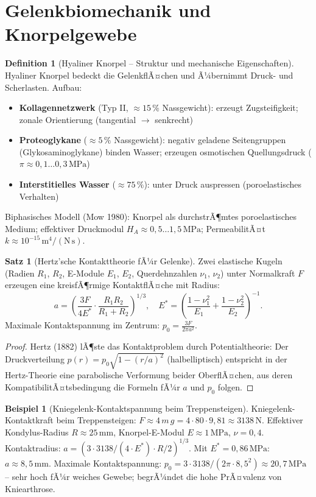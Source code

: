 ﻿\documentclass[a4paper,12pt]{report}
\theoremstyle{definition}
\newtheorem{definition}{Definition}
\newtheorem{beispiel}{Beispiel}
\newtheorem{satz}{Satz}
\begin{document}
\section{Gelenkbiomechanik und Knorpelgewebe}

\begin{definition}[Hyaliner Knorpel -- Struktur und mechanische Eigenschaften]
Hyaliner Knorpel bedeckt die GelenkflÃ¤chen und Ã¼bernimmt Druck- und Scherlasten.
Aufbau:
\begin{itemize}
    \item[-] \textbf{Kollagennetzwerk} (Typ II, $\approx 15\,\%$ Nassgewicht):
          erzeugt Zugsteifigkeit; zonale Orientierung (tangential $\to$ senkrecht)
    \item[-] \textbf{Proteoglykane} ($\approx 5\,\%$ Nassgewicht):
          negativ geladene Seitengruppen (Glykosaminoglykane) binden Wasser;
          erzeugen osmotischen Quellungsdruck ($\pi \approx 0{,}1\ldots0{,}3\,\mathrm{MPa}$)
    \item[-] \textbf{Interstitielles Wasser} ($\approx 75\,\%$):
          unter Druck auspressen (poroelastisches Verhalten)
\end{itemize}
Biphasisches Modell (Mow 1980): Knorpel als durchstrÃ¶mtes poroelastisches
Medium; effektiver Druckmodul $H_A \approx 0{,}5\ldots1{,}5\,\mathrm{MPa}$;
PermeabilitÃ¤t $k \approx 10^{-15}\,\mathrm{m^4/(N\,s)}$.
\end{definition}

\begin{satz}[Hertz'sche Kontakttheorie fÃ¼r Gelenke]
Zwei elastische Kugeln (Radien $R_1$, $R_2$, E-Module $E_1$, $E_2$,
Querdehnzahlen $\nu_1$, $\nu_2$) unter Normalkraft $F$ erzeugen eine
kreisfÃ¶rmige KontaktflÃ¤che mit Radius:
\[
  a = \left(\frac{3F}{4E^*}\cdot\frac{R_1 R_2}{R_1+R_2}\right)^{1/3},
  \quad E^* = \left(\frac{1-\nu_1^2}{E_1}+\frac{1-\nu_2^2}{E_2}\right)^{-1}.
\]
Maximale Kontaktspannung im Zentrum:
$p_0 = \frac{3F}{2\pi a^2}$.
\end{satz}
\begin{proof}
Hertz (1882) lÃ¶ste das Kontaktproblem durch Potentialtheorie:
Der Druckverteilung $p(r) = p_0\sqrt{1-(r/a)^2}$ (halbelliptisch)
entspricht in der Hertz-Theorie eine parabolische Verformung beider OberflÃ¤chen,
aus deren KompatibilitÃ¤tsbedingung die Formeln fÃ¼r $a$ und $p_0$ folgen.
\end{proof}

\begin{beispiel}[Kniegelenk-Kontaktspannung beim Treppensteigen]
Kniegelenk-Kontaktkraft beim Treppensteigen: $F \approx 4\,m\,g = 4\cdot80\cdot9{,}81 \approx 3138\,\mathrm{N}$.
Effektiver Kondylus-Radius $R \approx 25\,\mathrm{mm}$, Knorpel-E-Modul $E \approx 1\,\mathrm{MPa}$, $\nu = 0{,}4$.
Kontaktradius: $a = (3\cdot3138/(4\cdot E^*)\cdot R/2)^{1/3}$.
Mit $E^* = 0{,}86\,\mathrm{MPa}$: $a \approx 8{,}5\,\mathrm{mm}$.
Maximale Kontaktspannung: $p_0 = 3\cdot3138/(2\pi\cdot8{,}5^2) \approx 20{,}7\,\mathrm{MPa}$ --
sehr hoch fÃ¼r weiches Gewebe; begrÃ¼ndet die hohe PrÃ¤valenz von Kniearthrose.
\end{beispiel}
\end{document}
